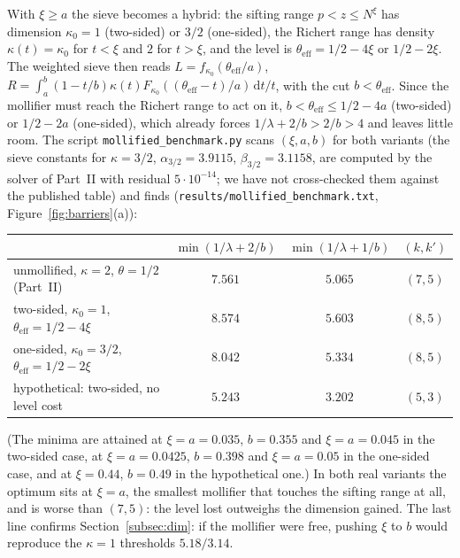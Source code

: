 \documentclass[11pt]{amsart}
\theoremstyle{remark}
\newcommand{\dd}{\mathrm{d}}
\begin{document}
With $\xi\ge a$ the sieve becomes a hybrid: the sifting range $p<z\le N^\xi$ has dimension $\kappa_0=1$ (two-sided) or $3/2$ (one-sided), the Richert range has density $\kappa(t)=\kappa_0$ for $t<\xi$ and $2$ for $t>\xi$, and the level is $\theta_{\mathrm{eff}}=1/2-4\xi$ or $1/2-2\xi$. The weighted sieve then reads $L=f_{\kappa_0}(\theta_{\mathrm{eff}}/a)$, $R=\int_a^b(1-t/b)\kappa(t)F_{\kappa_0}((\theta_{\mathrm{eff}}-t)/a)\,\dd t/t$, with the cut $b<\theta_{\mathrm{eff}}$. Since the mollifier must reach the Richert range to act on it, $b<\theta_{\mathrm{eff}}\le1/2-4a$ (two-sided) or $1/2-2a$ (one-sided), which already forces $1/\lambda+2/b>2/b>4$ and leaves little room. The script \texttt{mollified\_benchmark.py} scans $(\xi,a,b)$ for both variants (the sieve constants for $\kappa=3/2$, $\alpha_{3/2}=3.9115$, $\beta_{3/2}=3.1158$, are computed by the solver of Part~II with residual $5\cdot10^{-14}$; we have not cross-checked them against the published table) and finds (\texttt{results/mollified\_benchmark.txt}, Figure~\ref{fig:barriers}(a)):
\begin{center}\small
\begin{tabular}{l|cc|c}
\toprule
 & $\min(1/\lambda+2/b)$ & $\min(1/\lambda+1/b)$ & $(k,k')$\\
\midrule
unmollified, $\kappa=2$, $\theta=1/2$ (Part~II) & $7.561$ & $5.065$ & $(7,5)$\\
two-sided, $\kappa_0=1$, $\theta_{\mathrm{eff}}=1/2-4\xi$ & $8.574$ & $5.603$ & $(8,5)$\\
one-sided, $\kappa_0=3/2$, $\theta_{\mathrm{eff}}=1/2-2\xi$ & $8.042$ & $5.334$ & $(8,5)$\\
hypothetical: two-sided, no level cost & $5.243$ & $3.202$ & $(5,3)$\\
\bottomrule
\end{tabular}
\end{center}
(The minima are attained at $\xi=a=0.035$, $b=0.355$ and $\xi=a=0.045$ in the two-sided case, at $\xi=a=0.0425$, $b=0.398$ and $\xi=a=0.05$ in the one-sided case, and at $\xi=0.44$, $b=0.49$ in the hypothetical one.) In both real variants the optimum sits at $\xi=a$, the smallest mollifier that touches the sifting range at all, and is worse than $(7,5)$: the level lost outweighs the dimension gained. The last line confirms Section~\ref{subsec:dim}: if the mollifier were free, pushing $\xi$ to $b$ would reproduce the $\kappa=1$ thresholds $5.18/3.14$.
\end{document}

